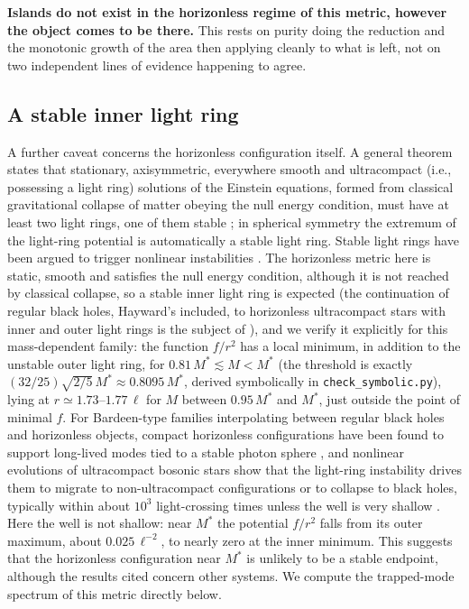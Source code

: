 \documentclass[11pt]{article}
\begin{document}
\textbf{Islands do not exist in the horizonless regime of this metric, however the object comes to be there.} This rests on purity doing the reduction and the monotonic growth of the area then applying cleanly to what is left, not on two independent lines of evidence happening to agree.

\subsection{A stable inner light ring}

A further caveat concerns the horizonless configuration itself. A general theorem states that stationary, axisymmetric, everywhere smooth and ultracompact (i.e., possessing a light ring) solutions of the Einstein equations, formed from classical gravitational collapse of matter obeying the null energy condition, must have at least two light rings, one of them stable \citep{CunhaBertiHerdeiro2017}; in spherical symmetry the extremum of the light-ring potential is automatically a stable light ring. Stable light rings have been argued to trigger nonlinear instabilities \citep{CardosoLongLived2014}. The horizonless metric here is static, smooth and satisfies the null energy condition, although it is not reached by classical collapse, so a stable inner light ring is expected (the continuation of regular black holes, Hayward's included, to horizonless ultracompact stars with inner and outer light rings is the subject of \citealt{CarballoRubio2022}), and we verify it explicitly for this mass-dependent family: the function $f/r^2$ has a local minimum, in addition to the unstable outer light ring, for $0.81\,M^*\lesssim M<M^*$ (the threshold is exactly $(32/25)\sqrt{2/5}\,M^*\approx0.8095\,M^*$, derived symbolically in \texttt{check\_symbolic.py}), lying at $r\simeq1.73$--$1.77\,\ell$ for $M$ between $0.95\,M^*$ and $M^*$, just outside the point of minimal $f$. For Bardeen-type families interpolating between regular black holes and horizonless objects, compact horizonless configurations have been found to support long-lived modes tied to a stable photon sphere \citep{Franzin2024}, and nonlinear evolutions of ultracompact bosonic stars show that the light-ring instability drives them to migrate to non-ultracompact configurations or to collapse to black holes, typically within about $10^3$ light-crossing times unless the well is very shallow \citep{Cunha2023}. Here the well is not shallow: near $M^*$ the potential $f/r^2$ falls from its outer maximum, about $0.025\,\ell^{-2}$, to nearly zero at the inner minimum. This suggests that the horizonless configuration near $M^*$ is unlikely to be a stable endpoint, although the results cited concern other systems. We compute the trapped-mode spectrum of this metric directly below.
\end{document}
